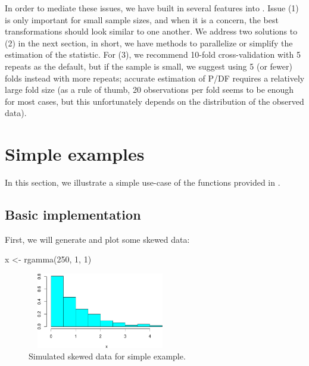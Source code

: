 In order to mediate these issues, we have built in several features into
. Issue (1) is only important for small sample sizes,
and when it is a concern, the best transformations should look similar
to one another. We address two solutions to (2) in the next section, in
short, we have methods to parallelize or simplify the estimation of the
statistic. For (3), we recommend 10-fold cross-validation with 5 repeats
as the default, but if the sample is small, we suggest using 5 (or
fewer) folds instead with more repeats; accurate estimation of P/DF
requires a relatively large fold size (as a rule of thumb, 20
observations per fold seems to be enough for most cases, but this
unfortunately depends on the distribution of the observed data).

\hypertarget{simple-examples}{%
\section{Simple examples}\label{simple-examples}}

In this section, we illustrate a simple use-case of the functions
provided in .

\hypertarget{basic-implementation}{%
\subsection{Basic implementation}\label{basic-implementation}}

First, we will generate and plot some skewed data:

\begin{Schunk}
\begin{Sinput}
x <- rgamma(250, 1, 1)
\end{Sinput}
\end{Schunk}

\begin{Schunk}
\begin{figure}

{\centering \includegraphics[width=2.5in,height=1.3in]{figs/simple_hist-1} 

}

\caption[Simulated skewed data for simple example]{Simulated skewed data for simple example.}\label{fig:simple_hist}
\end{figure}
\end{Schunk}


